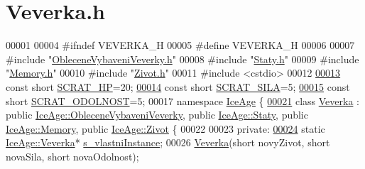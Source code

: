 \hypertarget{Veverka_8h_source}{}\section{Veverka.\+h}
\label{Veverka_8h_source}

\begin{DoxyCode}
00001 
00004 \textcolor{preprocessor}{#ifndef VEVERKA\_H}
00005 \textcolor{preprocessor}{#define VEVERKA\_H}
00006 
00007 \textcolor{preprocessor}{#include "\hyperlink{ObleceneVybaveniVeverky_8h}{ObleceneVybaveniVeverky.h}"}
00008 \textcolor{preprocessor}{#include "\hyperlink{Staty_8h}{Staty.h}"}
00009 \textcolor{preprocessor}{#include "\hyperlink{Memory_8h}{Memory.h}"}
00010 \textcolor{preprocessor}{#include "\hyperlink{Zivot_8h}{Zivot.h}"}
00011 \textcolor{preprocessor}{#include <cstdio>}
00012 
\hypertarget{Veverka_8h_source.tex_l00013}{}\hyperlink{Veverka_8h_a155cb6634ee33182e81d097c8795d031}{00013} \textcolor{keyword}{const} \textcolor{keywordtype}{short} \hyperlink{Veverka_8h_a155cb6634ee33182e81d097c8795d031}{SCRAT\_HP}=20; 
\hypertarget{Veverka_8h_source.tex_l00014}{}\hyperlink{Veverka_8h_a7e89f9c1f8405d36a24e427614e25e74}{00014} \textcolor{keyword}{const} \textcolor{keywordtype}{short} \hyperlink{Veverka_8h_a7e89f9c1f8405d36a24e427614e25e74}{SCRAT\_SILA}=5; 
\hypertarget{Veverka_8h_source.tex_l00015}{}\hyperlink{Veverka_8h_a752d429f0ea780b8e512e8b5e5776c1b}{00015} \textcolor{keyword}{const} \textcolor{keywordtype}{short} \hyperlink{Veverka_8h_a752d429f0ea780b8e512e8b5e5776c1b}{SCRAT\_ODOLNOST}=5; 
00017 \textcolor{keyword}{namespace }\hyperlink{namespaceIceAge}{IceAge} \{
\hypertarget{Veverka_8h_source.tex_l00021}{}\hyperlink{classIceAge_1_1Veverka}{00021}     \textcolor{keyword}{class }\hyperlink{classIceAge_1_1Veverka}{Veverka} : \textcolor{keyword}{public} \hyperlink{classIceAge_1_1ObleceneVybaveniVeverky}{IceAge::ObleceneVybaveniVeverky}, \textcolor{keyword}{public} 
      \hyperlink{classIceAge_1_1Staty}{IceAge::Staty}, \textcolor{keyword}{public} \hyperlink{classIceAge_1_1Memory}{IceAge::Memory}, \textcolor{keyword}{public} 
      \hyperlink{classIceAge_1_1Zivot}{IceAge::Zivot} \{
00022 
00023     \textcolor{keyword}{private}:
\hypertarget{Veverka_8h_source.tex_l00024}{}\hyperlink{classIceAge_1_1Veverka_acfa9aa07c2cfa881fbcc6feeb717c287}{00024}         \textcolor{keyword}{static} \hyperlink{classIceAge_1_1Veverka}{IceAge::Veverka}* \hyperlink{classIceAge_1_1Veverka_acfa9aa07c2cfa881fbcc6feeb717c287}{s\_vlastniInstance}; 
00026         \hyperlink{classIceAge_1_1Veverka_a527c1eeb2f4a165f65ade3852719ef68}{Veverka}(\textcolor{keywordtype}{short} novyZivot, \textcolor{keywordtype}{short} novaSila, \textcolor{keywordtype}{short} novaOdolnost); 

\end{DoxyCode}
